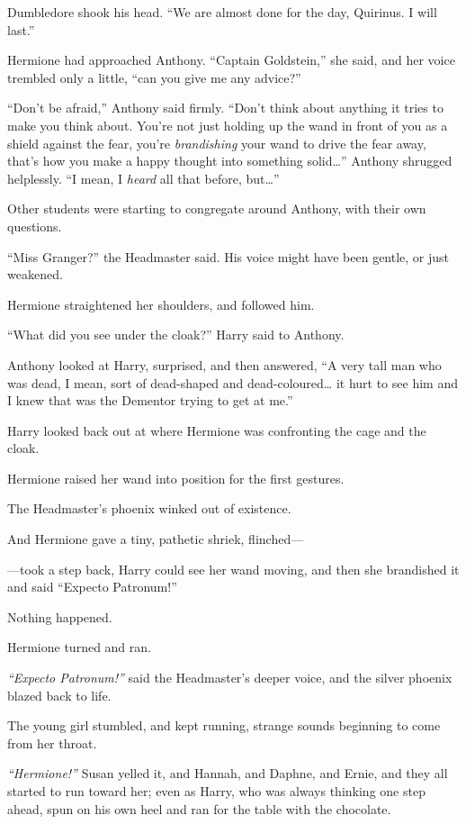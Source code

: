 Dumbledore shook his head. ``We are almost done for the day, Quirinus. I
will last.''

Hermione had approached Anthony. ``Captain Goldstein,'' she said, and
her voice trembled only a little, ``can you give me any advice?''

``Don't be afraid,'' Anthony said firmly. ``Don't think about anything
it tries to make you think about. You're not just holding up the wand in
front of you as a shield against the fear, you're \emph{brandishing}
your wand to drive the fear away, that's how you make a happy thought
into something solid\ldots{}'' Anthony shrugged helplessly. ``I mean, I
\emph{heard} all that before, but\ldots{}''

Other students were starting to congregate around Anthony, with their
own questions.

``Miss Granger?'' the Headmaster said. His voice might have been gentle,
or just weakened.

Hermione straightened her shoulders, and followed him.

``What did you see under the cloak?'' Harry said to Anthony.

Anthony looked at Harry, surprised, and then answered, ``A very tall man
who was dead, I mean, sort of dead-shaped and dead-coloured\ldots{} it
hurt to see him and I knew that was the Dementor trying to get at me.''

Harry looked back out at where Hermione was confronting the cage and the
cloak.

Hermione raised her wand into position for the first gestures.

The Headmaster's phoenix winked out of existence.

And Hermione gave a tiny, pathetic shriek, flinched---

---took a step back, Harry could see her wand moving, and then she
brandished it and said ``Expecto Patronum!''

Nothing happened.

Hermione turned and ran.

\emph{``Expecto Patronum!''} said the Headmaster's deeper voice, and the
silver phoenix blazed back to life.

The young girl stumbled, and kept running, strange sounds beginning to
come from her throat.

\emph{``Hermione!''} Susan yelled it, and Hannah, and Daphne, and Ernie,
and they all started to run toward her; even as Harry, who was always
thinking one step ahead, spun on his own heel and ran for the table with
the chocolate.


